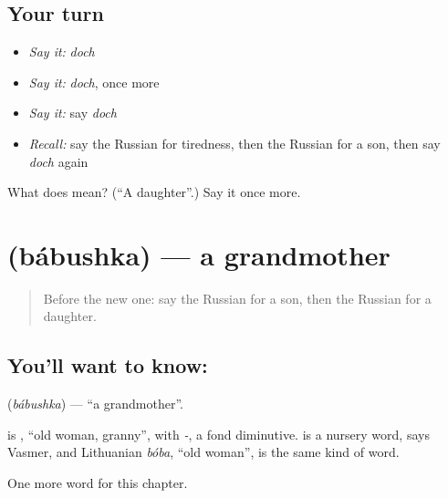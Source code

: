 \subsection*{Your turn}
\begin{itemize}
\raggedright
  \item \emph{Say it:} \emph{doch}
  \item \emph{Say it:} \emph{doch}, once more
  \item \emph{Say it:} say \emph{doch}
  \item \emph{Recall:} say the Russian for tiredness, then the Russian for a son, then say \emph{doch} again
\end{itemize}

\begin{tcolorbox}[breakable,colback=teal!4,colframe=teal!35!black,title={Before you move on}]
What does  mean? (\textquotedblleft{}A daughter\textquotedblright{}.) Say it once more.
\end{tcolorbox}
\section[\texorpdfstring{\ru{бабушка} (bábushka)}{бабушка (bábushka)}]{ (bábushka) — a grandmother}

\label{lesson:RU-C35-grandmother}



\begin{quote}
Before the new one: say the Russian for a son, then the Russian for a daughter.
\end{quote}

\subsection*{You'll want to know: }
\textbf{} (\emph{bábushka}) — \textquotedblleft{}a grandmother\textquotedblright{}.

\begin{cousinweb}
\textbf{} is \emph{}, \textquotedblleft{}old woman, granny\textquotedblright{}, with \emph{-}, a fond diminutive. \emph{} is a nursery word, says Vasmer, and Lithuanian \emph{bóba}, \textquotedblleft{}old woman\textquotedblright{}, is the same kind of word.
\end{cousinweb}

\begin{grammarlens}[title={What you've built}]
One more word for this chapter.
\end{grammarlens}

